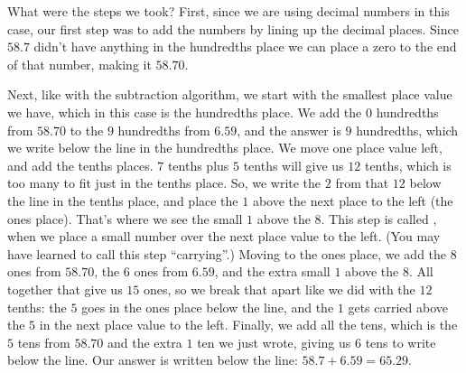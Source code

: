 \documentclass{ximera}
\begin{document}
\begin{image}  \end{image}

What were the steps we took? First, since we are using decimal numbers in this case, our first step was to add the numbers by lining up the decimal places. Since $58.7$ didn't have anything in the hundredths place we can place a zero to the end of that number, making it $58.70$.

Next, like with the subtraction algorithm, we start with the smallest place value we have, which in this case is the hundredths place. We add the $0$ hundredths from $58.70$ to the $9$ hundredths from $6.59$, and the answer is $9$ hundredths, which we write below the line in the hundredths place. We move one place value left, and add the tenths places. $7$ tenths plus $5$ tenths will give us $12$ tenths, which is too many to fit just in the tenths place. So, we write the $2$ from that $12$ below the line in the tenths place, and place the $1$ above the next place to the left (the ones place). That's where we see the small $1$ above the $8$. This step is called , when we place a small number over the next place value to the left. (You may have learned to call this step ``carrying''.) Moving to the ones place, we add the $8$ ones from $58.70$, the $6$ ones from $6.59$, and the extra small $1$ above the $8$. All together that give us $15$ ones, so we break that apart like we did with the $12$ tenths: the $5$ goes in the ones place below the line, and the $1$ gets carried above the $5$ in the next place value to the left. Finally, we add all the tens, which is the $5$ tens from $58.70$ and the extra $1$ ten we just wrote, giving us $6$ tens to write below the line. Our answer is written below the line: $58.7+6.59=65.29$.
\end{document}
